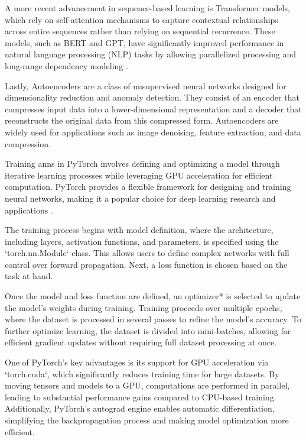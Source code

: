 A more recent advancement in sequence-based learning is Transformer models, which rely on self-attention mechanisms to capture contextual relationships across entire sequences rather than relying on sequential recurrence.
These models, such as BERT and GPT, have significantly improved performance in natural language processing (NLP) tasks by allowing parallelized processing and long-range dependency modeling \cite{vaswani2017attention}.

Lastly, Autoencoders are a class of unsupervised neural networks designed for dimensionality reduction and anomaly detection.
They consist of an encoder that compresses input data into a lower-dimensional representation and a decoder that reconstructs the original data from this compressed form.
Autoencoders are widely used for applications such as image denoising, feature extraction, and data compression.

Training \ac{ann}s in PyTorch involves defining and optimizing a model through iterative learning processes while leveraging GPU acceleration for efficient computation.
PyTorch provides a flexible framework for designing and training neural networks, making it a popular choice for deep learning research and applications \cite{paszke2019pytorch}.

The training process begins with model definition, where the architecture, including layers, activation functions, and parameters, is specified using the `torch.nn.Module` class.
This allows users to define complex networks with full control over forward propagation.
Next, a loss function is chosen based on the task at hand.

Once the model and loss function are defined, an optimizer* is selected to update the model’s weights during training.
Training proceeds over multiple epochs, where the dataset is processed in several passes to refine the model’s accuracy.
To further optimize learning, the dataset is divided into mini-batches, allowing for efficient gradient updates without requiring full dataset processing at once.

One of PyTorch’s key advantages is its support for GPU acceleration via `torch.cuda`, which significantly reduces training time for large datasets.
By moving tensors and models to a GPU, computations are performed in parallel, leading to substantial performance gains compared to CPU-based training.
Additionally, PyTorch's autograd engine enables automatic differentiation, simplifying the backpropagation process and making model optimization more efficient.

